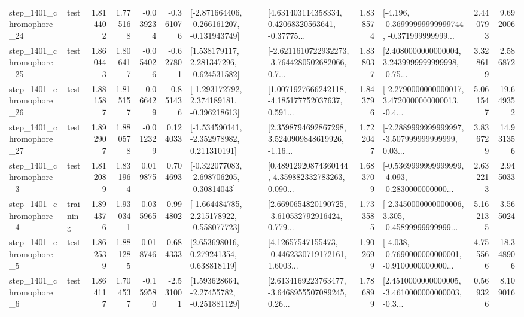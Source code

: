 \begin{tabular}{llrrrrllrlrr}
 step\_1401\_chromophore\_24 &      test &      1.814402 &    1.775168 &     -0.039234 & -0.361076 &  [-2.871664406, -0.266161207, -0.131943749] &  [4.631403114358334, 0.42068320563641, -0.37775... &       1.838574 &  [-4.196, -0.36999999999999744, -0.371999999999... &            2.440793 &          9.692006 \\
 step\_1401\_chromophore\_25 &      test &      1.860443 &    1.806417 &     -0.054026 & -0.627801 &    [1.538179117, 2.281347296, -0.624531582] &  [-2.6211610722932273, -3.7644280502682066, 0.7... &       1.838037 &  [2.4080000000000004, 3.2439999999999998, -0.75... &            3.328619 &          2.586872 \\
 step\_1401\_chromophore\_26 &      test &      1.881587 &    1.815157 &     -0.066429 & -0.851436 &   [-1.293172792, 2.374189181, -0.396218613] &  [1.0071927666242118, -4.185177752037637, 0.591... &       1.843796 &  [-2.2790000000000017, 3.4720000000000013, -0.4... &            5.061547 &         19.649352 \\
 step\_1401\_chromophore\_27 &      test &      1.892907 &    1.880578 &     -0.012329 &  0.124033 &   [-1.534590141, -2.352978982, 0.211310191] &  [2.3598794692867298, 3.5240909848619926, -1.16... &       1.722047 &  [-2.2889999999999997, -3.507999999999999, 0.03... &            3.836729 &         14.931356 \\
  step\_1401\_chromophore\_3 &      test &      1.812089 &    1.831964 &      0.019875 &  0.704693 &   [-0.322077083, -2.698706205, -0.30814043] &  [0.48912920874360144, 4.359882332783263, 0.090... &       1.683709 &  [-0.5369999999999999, -4.093, -0.2830000000000... &            2.632213 &          2.945033 \\
  step\_1401\_chromophore\_4 &  training &      1.894376 &    1.930341 &      0.035965 &  0.994802 &   [-1.664484785, 2.215178922, -0.558077723] &  [2.6690654820190725, -3.610532792916424, 0.779... &       1.733585 &  [-2.3450000000000006, 3.305, -0.45899999999999... &            5.162135 &          3.565024 \\
  step\_1401\_chromophore\_5 &      test &      1.862539 &    1.881285 &      0.018746 &  0.684333 &     [2.653698016, 0.279241354, 0.638818119] &  [4.12657547155473, -0.4462330719172161, 1.6003... &       1.902699 &  [-4.038, -0.7690000000000001, -0.9100000000000... &            4.755566 &         18.348906 \\
  step\_1401\_chromophore\_6 &      test &      1.864117 &    1.704537 &     -0.159580 & -2.531001 &    [1.593628664, -2.27455782, -0.251881129] &  [2.6134169223763477, -3.6468955507089245, 0.26... &       1.786899 &  [2.4510000000000005, -3.4610000000000003, -0.3... &            0.569326 &          8.109016 \\

\end{tabular}
